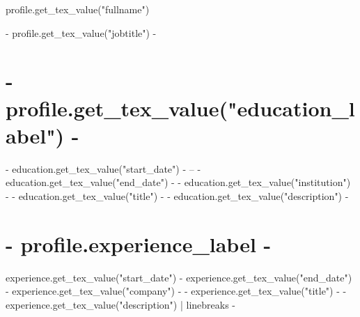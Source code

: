\documentclass[10pt]{FreemanCV}
\begin{document}
\begin{paracol}{2} %


\parbox[][0.11\textheight][c]{\linewidth}{ %
	\centering %

	{\sffamily\Huge {{ profile.get_tex_value("fullname") }} } %

	\medskip %

	{\cursivefont\Huge\textcolor{headings}{  {{ - profile.get_tex_value("jobtitle") - }} }}

	\vfill %
}

{%
\section{ {{ - profile.get_tex_value("education_label") - }} }
{%
\jobentry
	{ {{ - education.get_tex_value("start_date") - }} -- {{ - education.get_tex_value("end_date") - }} }
	{} %
	{ {{ - education.get_tex_value("institution") - }} }
	{ {{ - education.get_tex_value("title") - }} }
	{ {{ - education.get_tex_value("description") - }} }
{%
{%




{%
\section{ {{ - profile.experience_label - }} }
{%
\jobentry
	{ {{ experience.get_tex_value("start_date") }} - {{ experience.get_tex_value("end_date") }} } %
	{} %
	{ {{ - experience.get_tex_value("company") - }} } %
	{ {{ - experience.get_tex_value("title") - }} } %
	{ {{ - experience.get_tex_value("description") | linebreaks - }} } %
{%
{%




}}}}}}}}
\end{paracol}
\end{document}
